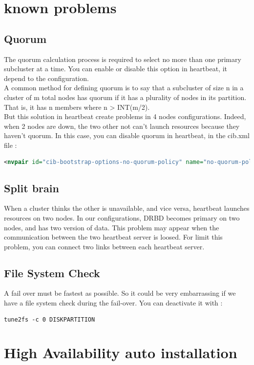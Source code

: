 \documentclass[a4paper,10pt]{report}
\begin{document}
\chapter{known problems}
\section{Quorum}
The quorum calculation process is required to select no more than one primary subcluster at a time. You can enable or disable this option in heartbeat, it depend to the configuration.\\
A common method for defining quorum is to say that a subcluster of size n in a cluster of m total nodes has quorum if it has a plurality of nodes in its partition. That is, it has n members where n > INT(m/2).\\
But this solution in heartbeat create problems in 4 nodes configurations. Indeed, when 2 nodes are down, the two other not can't launch resources because they haven't quorum. In this case, you
can disable quorum in heartbeat, in the cib.xml file :
\begin{lstlisting}[language=xml]
<nvpair id="cib-bootstrap-options-no-quorum-policy" name="no-quorum-policy" value="ignore"/>
\end{lstlisting}


\section{Split brain}
\label{splitbrain} 
When a cluster thinks the other is unavailable, and vice versa, heartbeat launches resources on two nodes. In our configurations, DRBD becomes primary on two nodes, and has two version of data. This problem may appear when the communication between the two heartbeat server is loosed.
For limit this problem, you can connect two links between each heartbeat server.



\section{File System Check}
A fail over must be fastest as possible. So it could be very embarrassing if we have a file system check during the fail-over. You can deactivate it with :
\begin{lstlisting}
tune2fs -c 0 DISKPARTITION
\end{lstlisting}

\chapter{High Availability auto installation}
\end{document}
